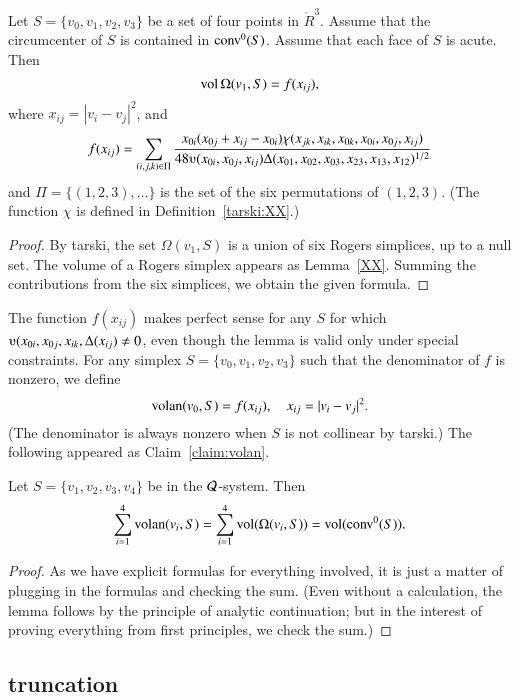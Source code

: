 
\begin{lemma}  Let $S = \{v_0,v_1,v_2,v_3\}$ be a set of four points in $\ring{R}^3$.
Assume that the circumcenter of $S$ is contained in ${\operatorname{conv}}^0(S)$.  Assume
that each face of $S$ is acute.
Then 
  $$
  {\operatorname{vol}}\,\Omega(v_1,S) = f(x_{ij}),
  $$ 
where $x_{ij} = |v_i-v_j|^2$, and
$$
   f(x_{ij}) = \sum_{(i,j,k)\in \Pi} \frac{x_{0i} (x_{0j}+x_{ij}-x_{0i})\chi(x_{jk},x_{ik},x_{0k},x_{0i},x_{0j},x_{ij})}
   {48\ups(x_{0i},x_{0j},x_{ij})\Delta(x_{01},x_{02},x_{03},x_{23},x_{13},x_{12})^{1/2}}
$$
and $\Pi = \{(1,2,3),\ldots\}$ is the set of the six permutations of $(1,2,3)$.
(The function $\chi$ is defined in Definition~\ref{tarski:XX}.)
\end{lemma}

\begin{proof} By tarski, the set $\Omega(v_1,S)$ is a union of
six Rogers simplices, up to a null set.  The volume of a Rogers simplex appears
as Lemma~\ref{XX}.  Summing the contributions from the six simplices, we obtain
the given formula.
\end{proof}

The function $f(x_{ij})$ makes perfect sense for any $S$ for which $\ups(x_{0i},x_{0j},x_{ik},\Delta(x_{ij})\ne 0$,
even though the lemma is valid only under special constraints.
For any simplex $S=\{v_0,v_1,v_2,v_3\}$ such that the denominator of $f$ is nonzero, we define
$$
{\operatorname{volan}}(v_0,S) = f(x_{ij}),\quad x_{ij} = |v_i-v_j|^2.
$$  
(The denominator is always nonzero when $S$ is not collinear by tarski.)
The following appeared as Claim~\ref{claim:volan}.

\begin{lemma}  %
Let $S=\{v_1,v_2,v_3,v_4\}$ be in the ${\mathcal Q}$-system. Then
    $$
    \sum_{i=1}^4 {\operatorname{volan}}(v_i,S) = \sum_{i=1}^4
    {\operatorname{vol}}(\Omega(v_i,S)) = {\operatorname{vol}}({\operatorname{conv}}^0(S)).
    $$
\end{lemma}

\begin{proof} As we have explicit formulas for everything involved,
it is just a matter of plugging in the formulas and checking the sum.
(Even without a calculation, the lemma follows by the principle of analytic continuation;
but in the interest of proving everything from first principles, we
check the sum.)
\end{proof}

\subsection{truncation}

